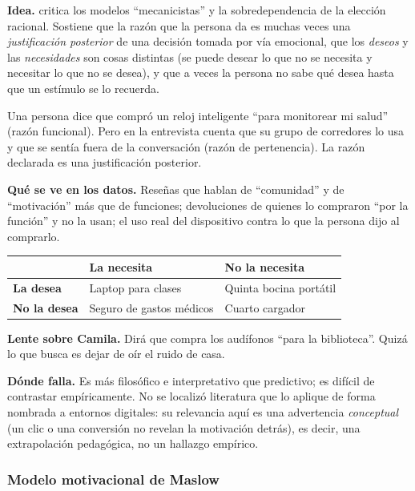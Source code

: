 \textbf{Idea.} \textcite{oshaughnessy1987} critica los modelos
\enquote{mecanicistas} y la sobredependencia de la elección racional. Sostiene
que la razón que la persona da es muchas veces una \emph{justificación posterior}
de una decisión tomada por vía emocional, que los \emph{deseos} y las
\emph{necesidades} son cosas distintas (se puede desear lo que no se necesita
y necesitar lo que no se desea), y que a veces la persona no sabe qué desea
hasta que un estímulo se lo recuerda.

\begin{cajaEjemplo}[title={Ejemplo: el reloj inteligente}]
Una persona dice que compró un reloj inteligente \enquote{para monitorear mi
salud} (razón funcional). Pero en la entrevista cuenta que su grupo de
corredores lo usa y que se sentía fuera de la conversación (razón de
pertenencia). La razón declarada es una justificación posterior.

\textbf{Qué se ve en los datos.} Reseñas que hablan de \enquote{comunidad} y de
\enquote{motivación} más que de funciones; devoluciones de quienes lo compraron
\enquote{por la función} y no la usan; el uso real del dispositivo contra lo que la persona
dijo al comprarlo.
\end{cajaEjemplo}

\begin{center}
\footnotesize
\begin{tabular}{@{}lll@{}}
\toprule
 & \textbf{La necesita} & \textbf{No la necesita} \\
\midrule
\textbf{La desea} & Laptop para clases & Quinta bocina portátil \\
\textbf{No la desea} & Seguro de gastos médicos & Cuarto cargador \\
\bottomrule
\end{tabular}
\end{center}

\textbf{Lente sobre Camila.} Dirá que compra los audífonos \enquote{para la
biblioteca}. Quizá lo que busca es dejar de oír el ruido de casa.

\textbf{Dónde falla.} Es más filosófico e interpretativo que predictivo; es
difícil de contrastar empíricamente. No se localizó literatura que lo aplique de
forma nombrada a entornos digitales: su relevancia aquí es una advertencia
\emph{conceptual} (un clic o una conversión no revelan la motivación detrás), es
decir, una extrapolación pedagógica, no un hallazgo empírico.

\subsubsection{Modelo motivacional de Maslow}
\label{sec:cap09-maslow}

